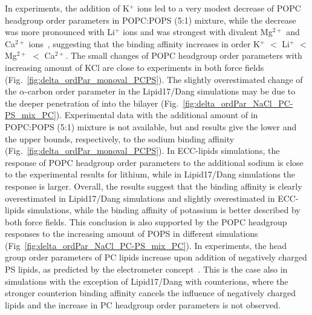 \documentclass[journal=jpcbfk,manuscript=article]{achemso}
\begin{document}
In experiments, the addition of K$^+$ ions led to a very modest decrease of POPC headgroup order parameters in POPC:POPS (5:1) mixture,
while the decrease was more pronounced with Li$^+$ ions and was strongest with divalent Mg$^{2+}$ and Ca$^{2+}$ ions~\cite{roux90},
suggesting that the binding affinity increases in order K$^{+}$ $<$ Li$^{+}$  $<$ Mg$^{2+}$  $<$ Ca$^{2+}$.
The small changes of POPC headgroup order parameters with increasing amount of KCl are close to experiments
in both force fields (Fig.~\ref{fig:delta_ordPar_monoval_PCPS}).
The slightly overestimated change of the $\alpha$-carbon
order parameter in the Lipid17/Dang simulations may be due to the
deeper penetration of  into the bilayer (Fig.~\ref{fig:delta_ordPar_NaCl_PC-PS_mix_PC}).
Experimental data with the additional amount of  in POPC:POPS (5:1) mixture is not available,
but  and  results give the lower and the upper bounds, respectively, to the sodium binding
affinity (Fig.~\ref{fig:delta_ordPar_monoval_PCPS}). In ECC-lipids simulations,
the response of POPC headgroup order parameters to the additional sodium is close to the
experimental results for lithium, while in Lipid17/Dang simulations the response is larger.
Overall, the results suggest that the  binding affinity is
clearly overestimated in Lipid17/Dang simulations and slightly overestimated in ECC-lipids simulations,
while the binding affinity of potassium is better described by both force fields.
This conclusion is also supported by the POPC headgroup responses to the
increasing amount of POPS in different simulations (Fig~\ref{fig:delta_ordPar_NaCl_PC-PS_mix_PC}).
In experiments, the head group order parameters of PC lipids increase upon addition of
negatively charged PS lipids, as predicted by the electrometer concept~\cite{seelig87,scherer87}.
This is the case also in simulations with the exception of
Lipid17/Dang with  counterions, where the stronger counterion binding affinity
cancels the influence of negatively charged lipids and the increase in PC headgroup
order parameters is not observed.%
\end{document}
